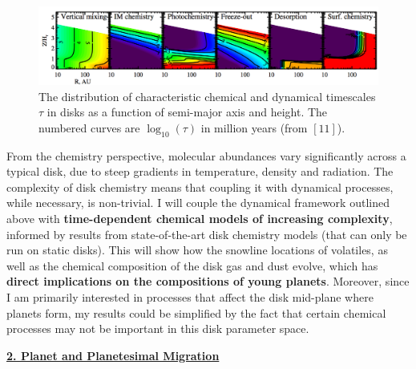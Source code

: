 \documentclass[12pt, letterpaper]{article}
\begin{document}
\begin{figure}[h!]
\centering
\includegraphics[width=\textwidth]{chemical_timescales}
\vspace{-0.3in}
\caption{The distribution of characteristic chemical and dynamical timescales $\tau$ in disks as a function of semi-major axis and height. The numbered curves are $\log_{10} (\tau)$ in million years (from $[11]$).}
\label{fig:chemical}
\end{figure}

From the chemistry perspective, molecular abundances vary significantly across a typical disk, due to steep gradients in temperature, density and radiation. 
The complexity of disk chemistry means that coupling it with dynamical processes, while necessary, is non-trivial.  I will couple the dynamical framework outlined above with \textbf{time-dependent chemical models of increasing complexity}, informed by results from state-of-the-art disk chemistry models (that can only be run on static disks). This will show how the snowline locations of volatiles, as well as the chemical composition of the disk gas and dust evolve, which has \textbf{direct implications on the compositions of young planets}. Moreover, since I am primarily interested in processes that affect the disk mid-plane where planets form, my results could be simplified by the fact that certain chemical processes may not be important in this disk parameter space.



\vspace{0.2in}
\underline{\textbf{2. Planet and Planetesimal Migration}}
\end{document}

